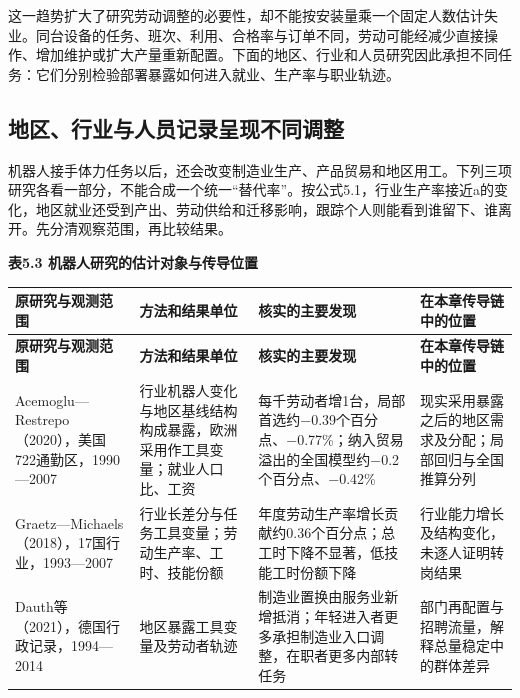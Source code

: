 \documentclass[UTF8,fontset=windows,12pt,a4paper,oneside,openany]{ctexbook}
\begin{document}
这一趋势扩大了研究劳动调整的必要性，却不能按安装量乘一个固定人数估计失业。同台设备的任务、班次、利用、合格率与订单不同，劳动可能经减少直接操作、增加维护或扩大产量重新配置。下面的地区、行业和人员研究因此承担不同任务：它们分别检验部署暴露如何进入就业、生产率与职业轨迹。

\subsection{地区、行业与人员记录呈现不同调整}

机器人接手体力任务以后，还会改变制造业生产、产品贸易和地区用工。下列三项研究各看一部分，不能合成一个统一“替代率”。按公式5.1，行业生产率接近a的变化，地区就业还受到产出、劳动供给和迁移影响，跟踪个人则能看到谁留下、谁离开。先分清观察范围，再比较结果。

\textbf{表5.3 机器人研究的估计对象与传导位置}

\begingroup\footnotesize\setlength{\tabcolsep}{4pt}\renewcommand{\arraystretch}{1.25}
\begin{longtable}{>{\raggedright\arraybackslash}p{}>{\raggedright\arraybackslash}p{}>{\raggedright\arraybackslash}p{}>{\raggedright\arraybackslash}p{}}
\toprule
\textbf{原研究与观测范围} & \textbf{方法和结果单位} & \textbf{核实的主要发现} & \textbf{在本章传导链中的位置} \\
\midrule\endfirsthead
\toprule
\textbf{原研究与观测范围} & \textbf{方法和结果单位} & \textbf{核实的主要发现} & \textbf{在本章传导链中的位置} \\
\midrule\endhead
\bottomrule\endfoot
Acemoglu—Restrepo（2020），美国722通勤区，1990—2007 & 行业机器人变化与地区基线结构构成暴露，欧洲采用作工具变量；就业人口比、工资 & 每千劳动者增1台，局部首选约\ensuremath{-}0.39个百分点、\ensuremath{-}0.77\%；纳入贸易溢出的全国模型约\ensuremath{-}0.2个百分点、\ensuremath{-}0.42\% & 现实采用暴露之后的地区需求及分配；局部回归与全国推算分列 \\
Graetz—Michaels（2018），17国行业，1993—2007 & 行业长差分与任务工具变量；劳动生产率、工时、技能份额 & 年度劳动生产率增长贡献约0.36个百分点；总工时下降不显著，低技能工时份额下降 & 行业能力增长及结构变化，未逐人证明转岗结果 \\
Dauth等（2021），德国行政记录，1994—2014 & 地区暴露工具变量及劳动者轨迹 & 制造业置换由服务业新增抵消；年轻进入者更多承担制造业入口调整，在职者更多内部转任务 & 部门再配置与招聘流量，解释总量稳定中的群体差异 \\
\end{longtable}\endgroup
\end{document}
